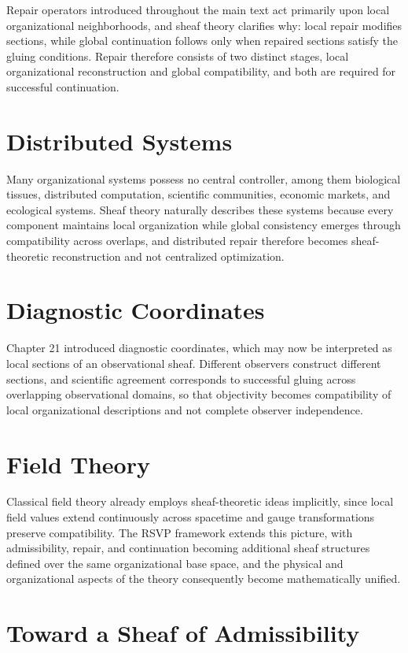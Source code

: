 \documentclass[11pt,oneside]{book}
\numberwithin{equation}{chapter}
\theoremstyle{definition}
\theoremstyle{plain}
\begin{document}
Repair operators introduced throughout the main text act primarily upon local organizational neighborhoods, and sheaf theory clarifies why: local repair modifies sections, while global continuation follows only when repaired sections satisfy the gluing conditions. Repair therefore consists of two distinct stages, local organizational reconstruction and global compatibility, and both are required for successful continuation.

\section{Distributed Systems}

Many organizational systems possess no central controller, among them biological tissues, distributed computation, scientific communities, economic markets, and ecological systems. Sheaf theory naturally describes these systems because every component maintains local organization while global consistency emerges through compatibility across overlaps, and distributed repair therefore becomes sheaf-theoretic reconstruction and not centralized optimization.

\section{Diagnostic Coordinates}

Chapter 21 introduced diagnostic coordinates, which may now be interpreted as local sections of an observational sheaf. Different observers construct different sections, and scientific agreement corresponds to successful gluing across overlapping observational domains, so that objectivity becomes compatibility of local organizational descriptions and not complete observer independence.

\section{Field Theory}

Classical field theory already employs sheaf-theoretic ideas implicitly, since local field values extend continuously across spacetime and gauge transformations preserve compatibility. The RSVP framework extends this picture, with admissibility, repair, and continuation becoming additional sheaf structures defined over the same organizational base space, and the physical and organizational aspects of the theory consequently become mathematically unified.

\section{Toward a Sheaf of Admissibility}
\end{document}
